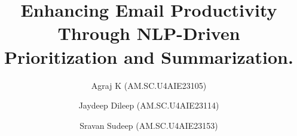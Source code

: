 \documentclass[3p,times,procedia]{elsarticle}
\begin{document}
\begin{frontmatter}




\title{ Enhancing Email Productivity Through
NLP-Driven Prioritization and Summarization.}




\author[a]{Agraj K (AM.SC.U4AIE23105)} 
\author[a]{Jaydeep Dileep (AM.SC.U4AIE23114)}
\author[a]{Sravan Sudeep (AM.SC.U4AIE23153)}

\address[a]{Department of Computer Science and Engineering (Artificial Intelligence), Amrita Vishwa Vidyapeetham, Amritapuri, India}


\end{frontmatter}
\end{document}
